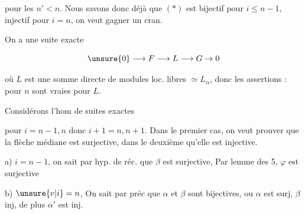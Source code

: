 
pour les $n'<n$.  Nous savons donc déjà que \deleted{\unsure{$\ast$}}$(\ast)$ est bijectif pour $i\leq n-1$, injectif pour $i=n$, on veut gagner un cran.

On a une suite exacte

\[
\unsure{0}\longrightarrow F\longrightarrow L\longrightarrow G\to0
\]

où  $L$ est une somme directe de modules loc. libres  $\simeq L_\alpha$, donc les assertions : pour $n$ sont vraies pour $L$.

Considérons l'hom de suites exactes


pour $i=n-1,n$ donc $i+1=n,n+1$. Dans le premier cas, on veut prouver que la flèche médiane est surjective, dans le deuxième qu'elle est injective.

a) $i=n-1$, on sait par hyp. de réc. que $\beta$ est surjective,    Par lemme des 5, $\varphi$ est  surjective 

b) $\unsure{v|i}=n$, On sait par    préc que $\alpha$ et $\beta$ sont bijectives, ou $\alpha$ est surj, $\beta$ inj, de plus $\alpha'$ est inj.

